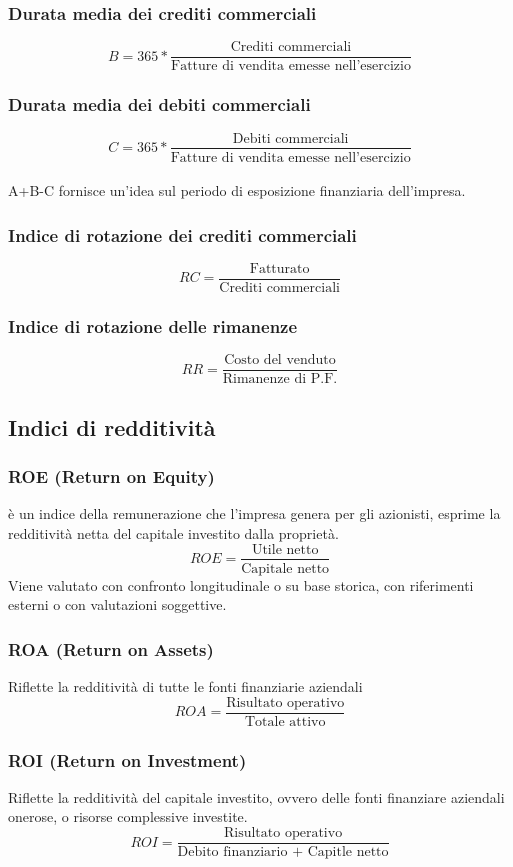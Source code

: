 \documentclass{report}
\begin{document}
	\subsubsection{Durata media dei crediti commerciali}
	\[B = 365 * \frac{\text{Crediti commerciali}}{\text{Fatture di vendita emesse nell'esercizio}}\]
	\subsubsection{Durata media dei debiti commerciali}
	\[C = 365 * \frac{\text{Debiti commerciali}}{\text{Fatture di vendita emesse nell'esercizio}}\]
	\medskip \\
	A+B-C fornisce un'idea sul periodo di esposizione finanziaria dell'impresa.
	\subsubsection{Indice di rotazione dei crediti commerciali}
	\[RC = \frac{\text{Fatturato}}{\text{Crediti commerciali}}\]
	\subsubsection{Indice di rotazione delle rimanenze}
	\[RR = \frac{\text{Costo del venduto}}{\text{Rimanenze di P.F.}}\]
	\subsection{Indici di redditività}
	\subsubsection{ROE (Return on Equity)}
	è un indice della remunerazione che l'impresa genera per gli azionisti, esprime la redditività netta del capitale investito dalla proprietà.
	\[ROE = \frac{\text{Utile netto}}{\text{Capitale netto}}\]
	Viene valutato con confronto longitudinale o su base storica, con riferimenti esterni o con valutazioni soggettive.
	\subsubsection{ROA (Return on Assets)}
	Riflette la redditività di tutte le fonti finanziarie aziendali
	\[ROA = \frac{\text{Risultato operativo}}{\text{Totale attivo}}\]
	\subsubsection{ROI (Return on Investment)}
	Riflette la redditività del capitale investito, ovvero delle fonti finanziare aziendali onerose, o risorse complessive investite.
	\[ROI = \frac{\text{Risultato operativo}}{\text{Debito finanziario + Capitle netto}}\]
\end{document}

